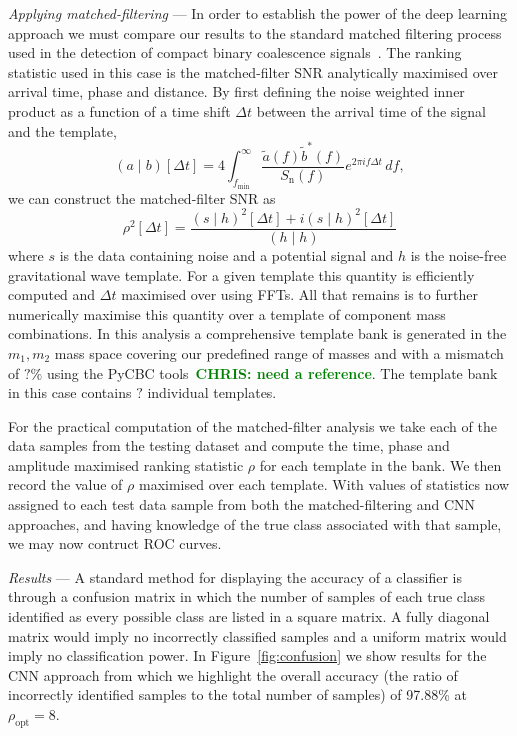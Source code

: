 \documentclass[%
showpacs,
 amsmath,amssymb,
 aps,
 twocolumn,
 prl,
 reprint,
floatfix,
]{revtex4-1}
\newcommand{\chris}[1]{\textbf{\textcolor{green}{CHRIS: #1}}}
\newcommand{\cnnsnreight}{97.88}
\begin{document}
%
%
\textit{Applying matched-filtering} ---
%
%
In order to establish the power of the deep learning approach we must compare
our results to the standard matched filtering process used in the detection of
compact binary coalescence
signals~\cite{PhysRevD.85.122006,2013PhRvD..87b4033B}. The ranking statistic
used in this case is the matched-filter \ac{SNR} analytically maximised over
arrival time, phase and distance. By first defining the noise weighted inner
product as a function of a time shift $\Delta t$ between the arrival time of
the signal and the template,
%
%
\begin{equation}
(a\mid b)[\Delta t] =
4\int_{f_{\mathrm{min}}}^{\infty}\frac{\tilde{a}(f)\tilde{b}^{*}(f)}{S_{\mathrm{n}}(f)}e^{2\pi i
f\Delta t}\,df,
\end{equation}
%
we can construct the matched-filter \ac{SNR} as 
%
\begin{equation}
\rho^{2}[\Delta t]=\frac{(s\mid h)^{2}[\Delta t] + i(s\mid h)^{2}[\Delta t]}{(h\mid h)}
\end{equation}
%
where $s$ is the data containing noise and a potential signal and $h$ is the
noise-free gravitational wave template. For a given template this quantity is
efficiently computed and $\Delta t$ maximised over using \acp{FFT}.  All that
remains is to further numerically maximise this quantity over a template of
component mass combinations. In this analysis a comprehensive template bank is
generated in the $m_{1},m_{2}$ mass space covering our predefined range of
masses and with a mismatch of $?\%$ using the PyCBC tools~\chris{need a
reference}. The template bank in this case contains $?$ individual templates. 

%
%
For the practical computation of the matched-filter analysis we take each of
the data samples from the testing dataset and compute the time, phase and
amplitude maximised ranking statistic $\rho$ for each template in the bank. We
then record the value of $\rho$ maximised over each template. With values of
statistics now assigned to each test data sample from both the
matched-filtering and \ac{CNN} approaches, and having knowledge of the
true class associated with that sample, we may now contruct \ac{ROC} curves.  

%
%
\textit{Results} --- 
%
%
A standard method for displaying the accuracy of a classifier is through a
confusion matrix in which the number of samples of each true class identified
as every possible class are listed in a square matrix. A fully diagonal matrix
would imply no incorrectly classified samples and a uniform matrix would imply
no classification power. In Figure~\ref{fig:confusion} we show results for the
\ac{CNN} approach from which we highlight the overall accuracy (the ratio of
incorrectly identified samples to the total number of samples) of
\cnnsnreight\% at $\rho_{\mathrm{opt}}=8$.
\end{document}
